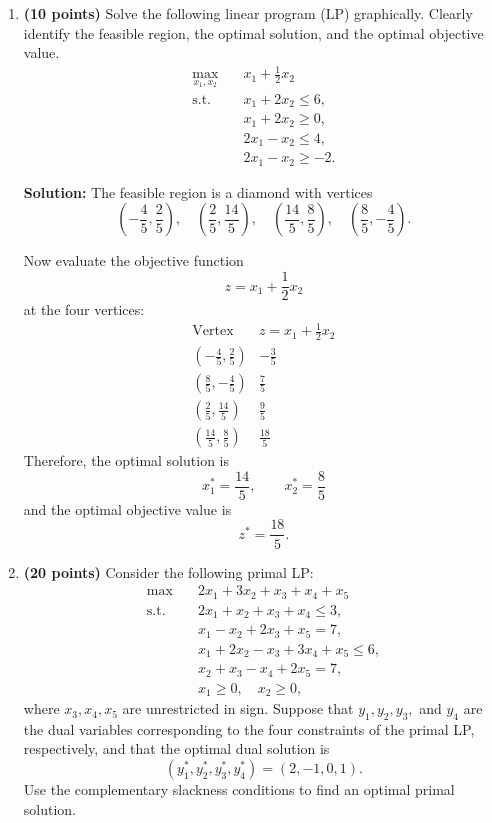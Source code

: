 \documentclass[11pt]{article}
\begin{document}
\newpage
\begin{enumerate}


\item \textbf{(10 points)} Solve the following linear program (LP) graphically. Clearly identify the feasible region, the optimal solution, and the optimal objective value.
\[
\begin{aligned}
\max_{x_1,x_2}\quad & x_1+\frac{1}{2}x_2\\
\text{s.t.}\quad 
& x_1+2x_2\leq 6,\\
& x_1+2x_2\geq 0,\\
& 2x_1-x_2\leq 4,\\
& 2x_1-x_2\geq -2.
\end{aligned}
\]

{\color{red}
\textbf{Solution:}
The feasible region is a diamond with vertices
\[
\left(-\frac{4}{5},\frac{2}{5}\right),
\quad
\left(\frac{2}{5},\frac{14}{5}\right),
\quad
\left(\frac{14}{5},\frac{8}{5}\right),
\quad
\left(\frac{8}{5},-\frac{4}{5}\right).
\]

Now evaluate the objective function
\[
z=x_1+\frac{1}{2}x_2
\]
at the four vertices:
\[
\begin{array}{c|c}
\text{Vertex} & z=x_1+\frac{1}{2}x_2\\
\hline
\left(-\frac{4}{5},\frac{2}{5}\right) & -\frac{3}{5}\\[0.2cm]
\left(\frac{8}{5},-\frac{4}{5}\right) & \frac{7}{5}\\[0.2cm]
\left(\frac{2}{5},\frac{14}{5}\right) & \frac{9}{5}\\[0.2cm]
\left(\frac{14}{5},\frac{8}{5}\right) & \frac{18}{5}
\end{array}
\]
Therefore, the optimal solution is
\[
\boxed{
x_1^*=\frac{14}{5},
\qquad
x_2^*=\frac{8}{5}
}
\]
and the optimal objective value is
\[
\boxed{
z^*=\frac{18}{5}.
}
\]
}

\vspace{1em}


\item \textbf{(20 points)} Consider the following primal LP:
\[
\begin{aligned}
\max \quad & 2x_1+3x_2+x_3+x_4+x_5\\
\text{s.t.}\quad
& 2x_1+x_2+x_3+x_4\leq 3,\\
& x_1-x_2+2x_3+x_5=7,\\
& x_1+2x_2-x_3+3x_4+x_5\leq 6,\\
& x_2+x_3-x_4+2x_5=7,\\
& x_1\geq 0,\quad x_2\geq 0,
\end{aligned}
\]
where $x_3,x_4,x_5$ are unrestricted in sign. Suppose that $y_1,y_2,y_3,$ and $y_4$ are the dual variables corresponding to the four constraints of the primal LP, respectively, and that the optimal dual solution is
\[
(y_1^*,y_2^*,y_3^*,y_4^*)=(2,-1,0,1).
\]
Use the complementary slackness conditions to find an optimal primal solution.


\end{enumerate}
\end{document}
